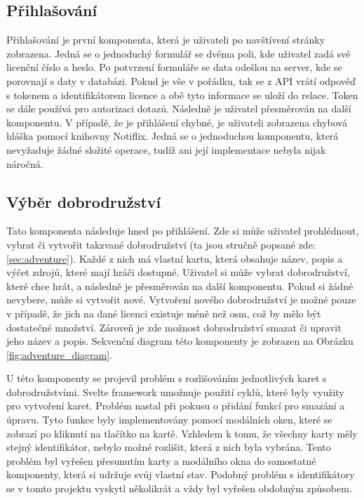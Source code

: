 \subsection{Přihlašování}
Přihlašování je první komponenta, která je uživateli po navštívení stránky zobrazena. Jedná se o jednoduchý formulář se dvěma poli, kde uživatel zadá své licenční číslo a heslo. Po potvrzení formuláře se data odešlou na server, kde se porovnají s daty v databázi. Pokud je vše v pořádku, tak se z API vrátí odpověď s tokenem a identifikátorem licence a obě tyto informace se uloží do relace. Token se dále používá pro autorizaci dotazů. Následně je uživatel přesměrován na další komponentu. V případě, že je přihlášení chybné, je uživateli zobrazena chybová hláška pomocí knihovny Notiflix. Jedná se o jednoduchou komponentu, která nevyžaduje žádné složité operace, tudíž ani její implementace nebyla nijak náročná.

\subsection{Výběr dobrodružství}
Tato komponenta následuje hned po přihlášení. Zde si může uživatel prohlédnout, vybrat či vytvořit takzvané dobrodružství (ta jsou stručně popsané zde: \ref{sec:adventure}). Každé z nich má vlastní kartu, která obsahuje název, popis a výčet zdrojů, které mají hráči dostupné. Uživatel si může vybrat dobrodružství, které chce hrát, a následně je přesměrován na další komponentu. Pokud si žádné nevybere, může si vytvořit nové. Vytvoření nového dobrodružství je možné pouze v případě, že jich na dané licenci existuje méně než osm, což by mělo být dostatečné množství. Zároveň je zde možnost dobrodružství smazat či upravit jeho název a popis. Sekvenční diagram této komponenty je zobrazen na Obrázku \ref{fig:adventure_diagram}.

U této komponenty se projevil problém s rozlišováním jednotlivých karet s dobrodružstvími. Svelte framework umožnuje použití cyklů, které byly využity pro vytvoření karet. Problém nastal při pokusu o přidání funkcí pro smazání a úpravu. Tyto funkce byly implementovány pomocí modálních oken, které se zobrazí po kliknutí na tlačítko na kartě. Vzhledem k tomu, že všechny karty měly stejný identifikátor, nebylo možné rozlišit, která z nich byla vybrána. Tento problém byl vyřešen přesunutím karty a modálního okna do samostatné komponenty, která si udržuje svůj vlastní stav. Podobný problém s identifikátory se v tomto projektu vyskytl několikrát a vždy byl vyřešen obdobným způsobem.

